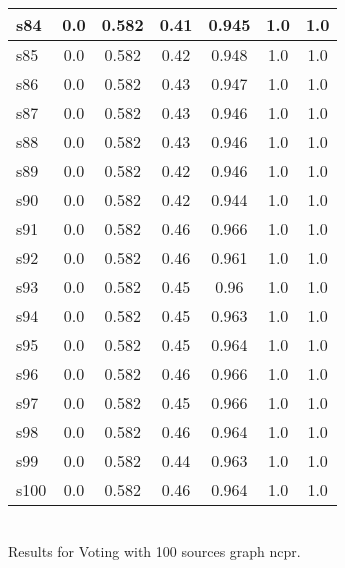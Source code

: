 \documentclass{article}
\begin{document}
\begin{tabular}{|l|c|c|c|c|c|c|}
\hline
s84 &0.0 & 0.582 & 0.41 & 0.945 & 1.0 & 1.0\\
\hline
s85 &0.0 & 0.582 & 0.42 & 0.948 & 1.0 & 1.0\\
\hline
s86 &0.0 & 0.582 & 0.43 & 0.947 & 1.0 & 1.0\\
\hline
s87 &0.0 & 0.582 & 0.43 & 0.946 & 1.0 & 1.0\\
\hline
s88 &0.0 & 0.582 & 0.43 & 0.946 & 1.0 & 1.0\\
\hline
s89 &0.0 & 0.582 & 0.42 & 0.946 & 1.0 & 1.0\\
\hline
s90 &0.0 & 0.582 & 0.42 & 0.944 & 1.0 & 1.0\\
\hline
s91 &0.0 & 0.582 & 0.46 & 0.966 & 1.0 & 1.0\\
\hline
s92 &0.0 & 0.582 & 0.46 & 0.961 & 1.0 & 1.0\\
\hline
s93 &0.0 & 0.582 & 0.45 & 0.96 & 1.0 & 1.0\\
\hline
s94 &0.0 & 0.582 & 0.45 & 0.963 & 1.0 & 1.0\\
\hline
s95 &0.0 & 0.582 & 0.45 & 0.964 & 1.0 & 1.0\\
\hline
s96 &0.0 & 0.582 & 0.46 & 0.966 & 1.0 & 1.0\\
\hline
s97 &0.0 & 0.582 & 0.45 & 0.966 & 1.0 & 1.0\\
\hline
s98 &0.0 & 0.582 & 0.46 & 0.964 & 1.0 & 1.0\\
\hline
s99 &0.0 & 0.582 & 0.44 & 0.963 & 1.0 & 1.0\\
\hline
s100 &0.0 & 0.582 & 0.46 & 0.964 & 1.0 & 1.0\\
\hline
\end{tabular}\\

\noindent Results for Voting with 100 sources graph ncpr.
\end{document}
